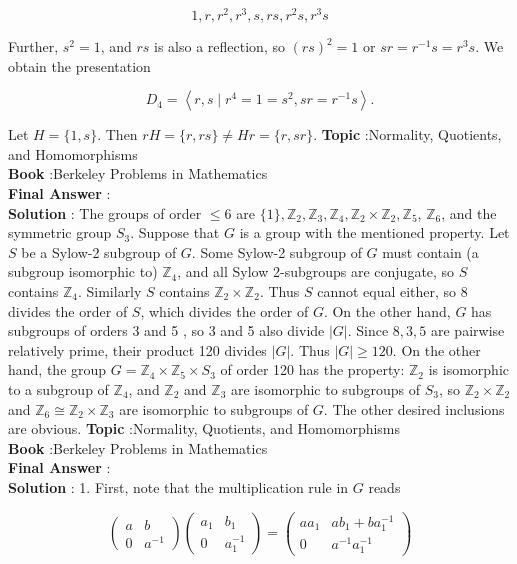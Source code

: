 \documentclass[10pt]{article}
\begin{document}
$$
1, r, r^{2}, r^{3}, s, r s, r^{2} s, r^{3} s
$$

Further, $s^{2}=1$, and $r s$ is also a reflection, so $(r s)^{2}=1$ or $s r=r^{-1} s=r^{3} s$. We obtain the presentation

$$
D_{4}=\left\langle r, s \mid r^{4}=1=s^{2}, s r=r^{-1} s\right\rangle .
$$

Let $H=\{1, s\}$. Then $r H=\{r, r s\} \neq H r=\{r, s r\}$.
\textbf{Topic} :Normality, Quotients, and Homomorphisms \\
\textbf{Book} :Berkeley Problems in Mathematics\\
\textbf{Final Answer} :\\


\textbf{Solution} : The groups of order $\leqslant 6$ are $\{1\}, \mathbb{Z}_{2}, \mathbb{Z}_{3}, \mathbb{Z}_{4}, \mathbb{Z}_{2} \times \mathbb{Z}_{2}, \mathbb{Z}_{5}$, $\mathbb{Z}_{6}$, and the symmetric group $S_{3}$. Suppose that $G$ is a group with the mentioned property. Let $S$ be a Sylow-2 subgroup of $G$. Some Sylow-2 subgroup of $G$ must contain (a subgroup isomorphic to) $\mathbb{Z}_{4}$, and all Sylow 2-subgroups are conjugate, so $S$ contains $\mathbb{Z}_{4}$. Similarly $S$ contains $\mathbb{Z}_{2} \times \mathbb{Z}_{2}$. Thus $S$ cannot equal either, so 8 divides the order of $S$, which divides the order of $G$. On the other hand, $G$ has subgroups of orders 3 and 5 , so 3 and 5 also divide $|G|$. Since $8,3,5$ are pairwise relatively prime, their product 120 divides $|G|$. Thus $|G| \geqslant 120$. On the other hand, the group $G=\mathbb{Z}_{4} \times \mathbb{Z}_{5} \times S_{3}$ of order 120 has the property: $\mathbb{Z}_{2}$ is isomorphic to a subgroup of $\mathbb{Z}_{4}$, and $\mathbb{Z}_{2}$ and $\mathbb{Z}_{3}$ are isomorphic to subgroups of $S_{3}$, so $\mathbb{Z}_{2} \times \mathbb{Z}_{2}$ and $\mathbb{Z}_{6} \cong \mathbb{Z}_{2} \times \mathbb{Z}_{3}$ are isomorphic to subgroups of $G$. The other desired inclusions are obvious.
\textbf{Topic} :Normality, Quotients, and Homomorphisms \\
\textbf{Book} :Berkeley Problems in Mathematics\\
\textbf{Final Answer} :\\


\textbf{Solution} : 1. First, note that the multiplication rule in $G$ reads

$$
\left(\begin{array}{cc}
a & b \\
0 & a^{-1}
\end{array}\right)\left(\begin{array}{cc}
a_{1} & b_{1} \\
0 & a_{1}^{-1}
\end{array}\right)=\left(\begin{array}{cc}
a a_{1} & a b_{1}+b a_{1}^{-1} \\
0 & a^{-1} a_{1}^{-1}
\end{array}\right)
$$
\end{document}
